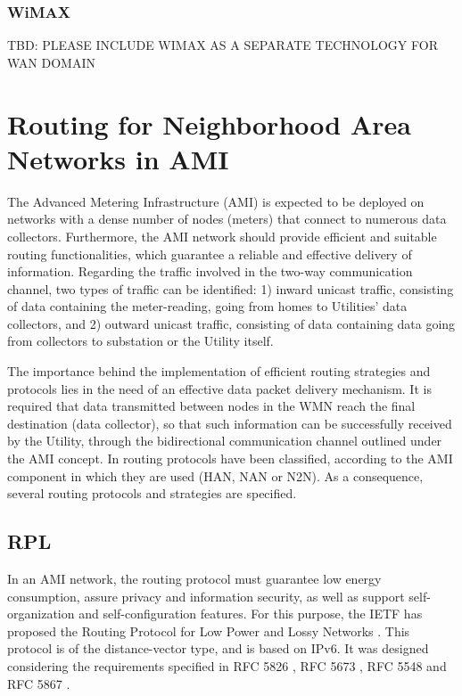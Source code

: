 \documentclass[11pt,draftclsnofoot,onecolumn]{IEEEtran}
\begin{document}
\subsubsection{WiMAX}\label{tech::wimax}
TBD: PLEASE INCLUDE WIMAX AS A SEPARATE TECHNOLOGY FOR WAN DOMAIN


\section{Routing for Neighborhood Area Networks in AMI} \label{routing}

The Advanced Metering Infrastructure (AMI) is expected to be deployed on networks with a dense number of nodes (meters) that connect to numerous data collectors. Furthermore, the AMI network should provide efficient and suitable routing functionalities, which guarantee a reliable and effective delivery of information. Regarding the traffic involved in the two-way communication channel, two types of traffic can be identified: 1) inward unicast traffic, consisting of data containing the meter-reading, going from homes to Utilities’ data collectors, and 2) outward unicast traffic, consisting of data containing data going from collectors to substation or the Utility itself. 

The importance behind the implementation of efficient routing strategies and protocols lies in the need of an effective data packet delivery mechanism. It is required that data transmitted between nodes in the WMN reach the final destination (data collector), so that such information can be successfully received by the Utility, through the bidirectional communication channel outlined under the AMI concept. In \cite{Sabbah2014} routing protocols have been classified, according to the AMI component in which they are used (HAN, NAN or N2N). As a consequence, several routing protocols and strategies are specified.


\subsection{RPL}\label{rpl}

In an AMI network, the routing protocol must guarantee low energy consumption, assure privacy and information security, as well as support self-organization and self-configuration features. For this purpose, the IETF has proposed the Routing Protocol for Low Power and Lossy Networks \cite{Winter2012}. This protocol is of the distance-vector type, and is based on IPv6. It was designed considering the requirements specified in RFC 5826 \cite{Brandt2010}, RFC 5673 \cite{Pister2009}, RFC 5548 \cite{Dohler2009} and RFC 5867 \cite{Martocci2010}. 
\end{document}

